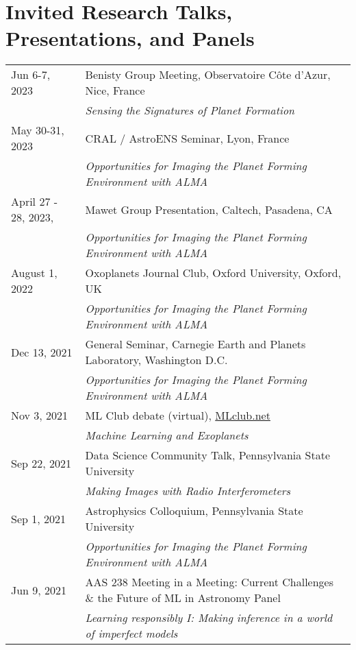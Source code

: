 \section*{Invited Research Talks, Presentations, and Panels}
\setlength\LTleft{0pt}
\setlength\LTright{0pt}
\begin{longtable}{@{\hspace{10pt}}p{1.2in}l}
  Jun 6-7, 2023 & Benisty Group Meeting, Observatoire C\^{o}te d'Azur, Nice, France \\
  & \emph{Sensing the Signatures of Planet Formation} \\[\rowskip] 
  May 30-31, 2023 & CRAL / AstroENS Seminar, Lyon, France \\[\rowskip] 
  & \emph{Opportunities for Imaging the Planet Forming Environment with ALMA}\\[\rowskip] 
  April 27 - 28, 2023, & Mawet Group Presentation, Caltech, Pasadena, CA \\
  & \emph{Opportunities for Imaging the Planet Forming Environment with ALMA}\\[\rowskip] 
  August 1, 2022 & Oxoplanets Journal Club, Oxford University, Oxford, UK\\
  & \emph{Opportunities for Imaging the Planet Forming Environment with ALMA}\\[\rowskip] 
  Dec 13, 2021 & General Seminar, Carnegie Earth and Planets Laboratory, Washington D.C. \\
  & \emph{Opportunities for Imaging the Planet Forming Environment with ALMA} \\[\rowskip]
  Nov 3, 2021 & ML Club debate (virtual), \href{https://docs.google.com/document/d/1GGtE-YIuAWlmpKSr38_kyiF-Fklszhkh4FkiYWzBAho/pub}{MLclub.net} \\
  & \emph{Machine Learning and Exoplanets}\\[\rowskip]
  Sep 22, 2021 & Data Science Community Talk, Pennsylvania State University\\
  & \emph{Making Images with Radio Interferometers} \\[\rowskip]
  Sep 1, 2021 & Astrophysics Colloquium, Pennsylvania State University\\
  & \emph{Opportunities for Imaging the Planet Forming Environment with ALMA} \\[\rowskip]
  Jun 9, 2021 & AAS 238 Meeting in a Meeting: Current Challenges \& the Future of ML in Astronomy Panel\\
  & \emph{Learning responsibly I: Making inference in a world of imperfect models} \\[\rowskip]

\end{longtable}
